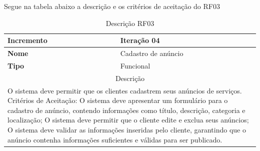 \clearpage
Segue na tabela abaixo a descrição e os critérios de aceitação do RF03
\begin{table}[htb]
	\centering
	\caption{\label{Formatação do texto.}Descrição RF03}	
	\begin{tabular}{|l|p{11cm}|}
		\hline
		\textbf{Incremento}    & Iteração 04\\ \hline
		\textbf{Nome}    & Cadastro de anúncio\\ \hline
		\textbf{Tipo}    & Funcional\\ \hline
		\multicolumn{2}{|c|}{Descrição}\\ \hline
		\multicolumn{2}{|p{12cm}|}{
			O sistema deve permitir que os clientes cadastrem seus anúncios de serviços. \newline
			\newline Critérios de Aceitação: \newline
			O sistema deve apresentar um formulário para o cadastro de anúncio, contendo informações como título, descrição, categoria e localização; \newline
			\newline O sistema deve permitir que o cliente edite e exclua seus anúncios;\newline
			\newline O sistema deve validar as informações inseridas pelo cliente, garantindo que o anúncio contenha informações suficientes e válidas para ser publicado.
			} \\ \hline
	\end{tabular}
\end{table}

